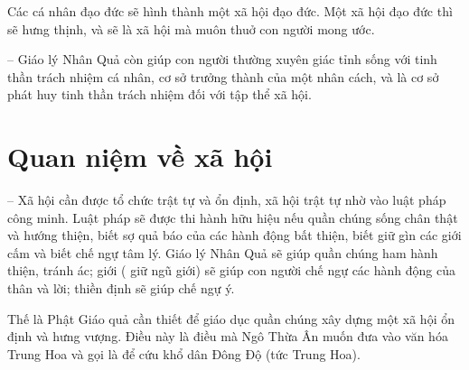Các cá nhân đạo đức sẽ hình thành một xã hội đạo đức. Một xã hội đạo đức thì sẽ hưng thịnh, và sẽ là xã hội mà muôn thuở con người mong ước.

-- Giáo lý Nhân Quả còn giúp con người thường xuyên giác tỉnh sống với tinh thần trách nhiệm cá nhân, cơ sở trưởng thành của một nhân cách, và là cơ sở phát huy tinh thần trách nhiệm đối với tập thể xã hội.

\section{Quan niệm về xã hội} %
\label{sec:87_xa_hoi}

-- Xã hội cần được tổ chức trật tự và ổn định, xã hội trật tự nhờ vào luật pháp công minh. Luật pháp sẽ được thi hành hữu hiệu nếu quần chúng sống chân thật và hướng thiện, biết sợ quả báo của các hành động bất thiện, biết giữ gìn các giới cấm và biết chế ngự tâm lý. Giáo lý Nhân Quả sẽ giúp quần chúng ham hành thiện, tránh ác; giới ( giữ ngũ giới) sẽ giúp con người chế ngự các hành động của thân và lời; thiền định sẽ giúp chế ngự ý.

Thế là Phật Giáo quả cần thiết để giáo dục quần chúng xây dựng một xã hội ổn định và hưng vượng. Điều này là điều mà Ngô Thừa Ân muốn đưa vào văn hóa Trung Hoa và gọi là để cứu khổ dân Đông Độ (tức Trung Hoa).
